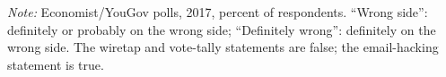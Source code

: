 \documentclass[11pt]{article}
\begin{document}
\begin{table}[H]
\centering
\caption{Media-poll items that let respondents say how sure they were}
\label{tab:graded}
\TableStyle

\begin{minipage}{0.95\linewidth}
\vspace{0.5em}\footnotesize \emph{Note:} Economist/YouGov polls, 2017, percent of respondents. ``Wrong side'': definitely or probably on the wrong side; ``Definitely wrong'': definitely on the wrong side. The wiretap and vote-tally statements are false; the email-hacking statement is true.
\end{minipage}
\end{table}
\end{document}
